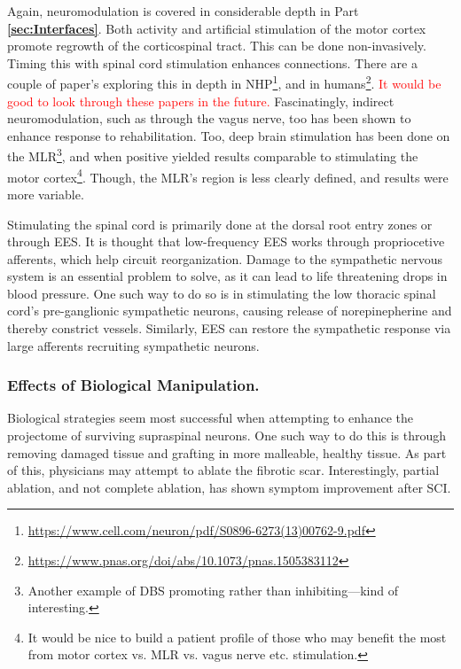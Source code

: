 \documentclass[12pt]{report}
\begin{document}
Again, neuromodulation is covered in considerable depth in Part \textbf{\ref{sec:Interfaces}}. Both activity and artificial stimulation of the motor cortex promote regrowth of the corticospinal tract. This can be done non-invasively. Timing this with spinal cord stimulation enhances connections. There are a couple of paper's exploring this in depth in NHP\footnote{\url{https://www.cell.com/neuron/pdf/S0896-6273(13)00762-9.pdf}}, and in humans\footnote{\url{https://www.pnas.org/doi/abs/10.1073/pnas.1505383112}}. \textcolor{red}{It would be good to look through these papers in the future.} Fascinatingly, indirect neuromodulation, such as through the vagus nerve, too has been shown to enhance response to rehabilitation. Too, deep brain stimulation has been done on the MLR\footnote{Another example of DBS promoting rather than inhibiting---kind of interesting.}, and when positive yielded results comparable to stimulating the motor cortex\footnote{It would be nice to build a patient profile of those who may benefit the most from motor cortex vs. MLR vs. vagus nerve etc. stimulation.}. Though, the MLR's region is less clearly defined, and results were more variable.\newline

Stimulating the spinal cord is primarily done at the dorsal root entry zones or through EES. It is thought that low-frequency EES works through propriocetive afferents, which help circuit reorganization. Damage to the sympathetic nervous system is an essential problem to solve, as it can lead to life threatening drops in blood pressure. One such way to do so is in stimulating the low thoracic spinal cord's pre-ganglionic sympathetic neurons, causing release of norepinepherine and thereby constrict vessels. Similarly, EES can restore the sympathetic response via large afferents recruiting sympathetic neurons. 

\subsubsection{Effects of Biological Manipulation.}

Biological strategies seem most successful when attempting to enhance the projectome of surviving supraspinal neurons. One such way to do this is through removing damaged tissue and grafting in more malleable, healthy tissue. As part of this, physicians may attempt to ablate the fibrotic scar. Interestingly, partial ablation, and not complete ablation, has shown symptom improvement after SCI. \newline
\end{document}
